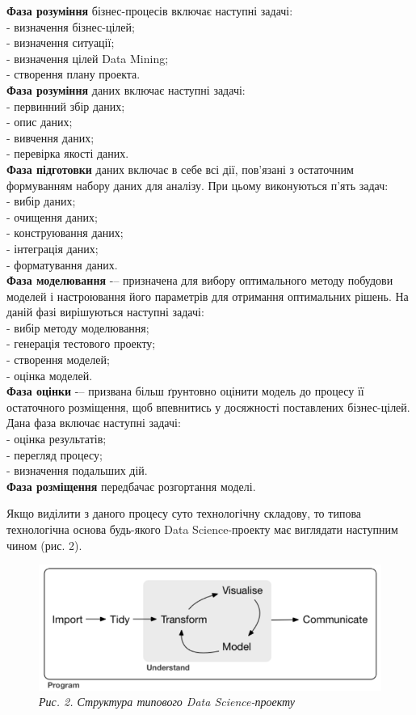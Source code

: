 \documentclass[
]{book}
\begin{document}
\textbf{Фаза розуміння} бізнес-процесів включає наступні задачі:\\
- визначення бізнес-цілей;\\
- визначення ситуації;\\
- визначення цілей Data Mining;\\
- створення плану проекта.\\
\textbf{Фаза розуміння} даних включає наступні задачі:\\
- первинний збір даних;\\
- опис даних;\\
- вивчення даних;\\
- перевірка якості даних.\\
\textbf{Фаза підготовки} даних включає в себе всі дії, пов'язані з остаточним формуванням набору даних для аналізу. При цьому виконуються п'ять задач:\\
- вибір даних;\\
- очищення даних;\\
- конструювання даних;\\
- інтеграція даних;\\
- форматування даних.\\
\textbf{Фаза моделювання} -\/-- призначена для вибору оптимального методу побудови моделей і настроювання його параметрів для отримання оптимальних рішень. На даній фазі вирішуються наступні задачі:\\
- вибір методу моделювання;\\
- генерація тестового проекту;\\
- створення моделей;\\
- оцінка моделей.\\
\textbf{Фаза оцінки} -\/-- призвана більш ґрунтовно оцінити модель до процесу її остаточного розміщення, щоб впевнитись у досяжності поставлених бізнес-цілей. Дана фаза включає наступні задачі:\\
- оцінка результатів;\\
- перегляд процесу;\\
- визначення подальших дій.\\
\textbf{Фаза розміщення} передбачає розгортання моделі.

Якщо виділити з даного процесу суто технологічну складову, то типова технологічна основа будь-якого Data Science-проекту має виглядати наступним чином \citep{r4ds} (рис. 2).

\begin{figure}
\centering
\includegraphics{image/process_DS.png}
\caption{\emph{Рис. 2. Структура типового Data Science-проекту}}
\end{figure}
\end{document}
